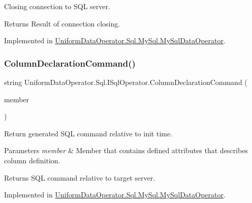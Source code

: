 Closing connection to S\+QL server. 

\begin{DoxyReturn}{Returns}
Result of connection closing.
\end{DoxyReturn}


Implemented in \mbox{\hyperlink{class_uniform_data_operator_1_1_sql_1_1_my_sql_1_1_my_sql_data_operator_ae096306ef55611afbe96b0017f2032f6}{Uniform\+Data\+Operator.\+Sql.\+My\+Sql.\+My\+Sql\+Data\+Operator}}.

\mbox{\label{interface_uniform_data_operator_1_1_sql_1_1_i_sql_operator_aac9c3ed1e73af66e383340a154786ec7}} 
\subsubsection{\texorpdfstring{Column\+Declaration\+Command()}{ColumnDeclarationCommand()}}
{\footnotesize\ttfamily string Uniform\+Data\+Operator.\+Sql.\+I\+Sql\+Operator.\+Column\+Declaration\+Command (\begin{DoxyParamCaption}\item[{Member\+Info}]{member }\end{DoxyParamCaption})}



Return generated S\+QL command relative to init time. 


\begin{DoxyParams}{Parameters}
{\em member} & Member that contains defined attributes that describes column definition.\\
\hline
\end{DoxyParams}
\begin{DoxyReturn}{Returns}
S\+QL command relative to target server.
\end{DoxyReturn}


Implemented in \mbox{\hyperlink{class_uniform_data_operator_1_1_sql_1_1_my_sql_1_1_my_sql_data_operator_a0bdc2943e5d10576fb564913cdd744e7}{Uniform\+Data\+Operator.\+Sql.\+My\+Sql.\+My\+Sql\+Data\+Operator}}.

\mbox{\label{interface_uniform_data_operator_1_1_sql_1_1_i_sql_operator_a51af40df39808d53cdcc81852b836634}} 
